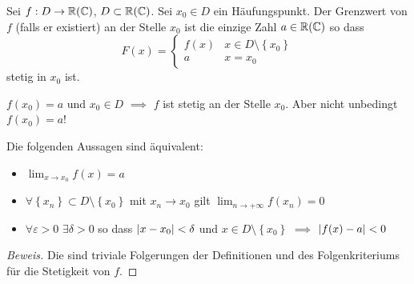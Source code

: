
\begin{Def}
  Sei $f:D\to\mathbb{R}(\mathbb{C})$, $D\subset \mathbb{R}(\mathbb{C})$. 
Sei $x_0\in D$ ein Häufungspunkt. 
Der Grenzwert von $f$ (falls er existiert) an der Stelle 
$x_0$ ist die einzige Zahl $a\in\mathbb{R}(\mathbb{C})$ so dass
  \[F(x)=\begin{cases}
    f(x)&x\in D\setminus \left\{ x_0 \right\}\\
    a&x=x_0
  \end{cases}\]
  stetig in $x_0$ ist.
\end{Def}
\begin{Bem}
  $f(x_0)=a$ und $x_0\in D$ $\implies$ $f$ ist stetig an der Stelle $x_0$.
Aber nicht unbedingt $f(x_0)=a$!
\end{Bem}
\begin{Sat}\label{s:Ch}
  Die folgenden Aussagen sind äquivalent:
  \begin{itemize}
    \item $\lim_{x\to x_0}f(x)=a$
    \item $\forall \left\{ x_n \right\}\subset D\setminus\left\{ x_0 \right\}$ mit $x_n\to x_0$ gilt $\lim_{n\to +\infty} f(x_n)=0$
    \item $\forall \varepsilon >0$ $\exists\delta>0$ so dass $\mathopen| x-x_0 \mathclose|<\delta$ und $x\in D\setminus\left\{ x_0 \right\}$ $\implies$ $\mathopen| f(x)-a \mathclose|<0$
  \end{itemize}
\end{Sat}
\begin{proof}[Beweis] Die sind triviale Folgerungen der 
Definitionen und des Folgenkriteriums f\"ur die Stetigkeit von $f$.
\end{proof}

